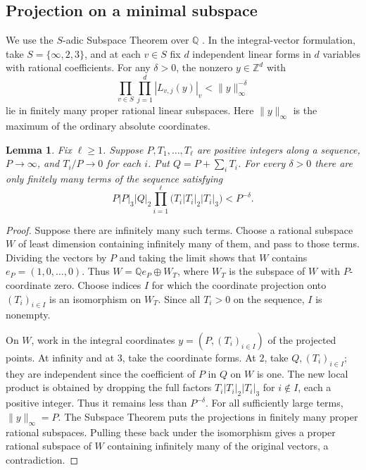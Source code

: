 \documentclass[11pt]{article}
\newtheorem{lemma}[theorem]{Lemma}
\theoremstyle{definition}
\newcommand{\Z}{\mathbb Z}
\newcommand{\Q}{\mathbb Q}
\begin{document}
\subsection{Projection on a minimal subspace}

We use the \(S\)-adic Subspace Theorem over \(\Q\)
\cite{Schlickewei}\cite[Theorem~2.3]{Bilu}.
In the integral-vector formulation, take
\(S=\{\infty,2,3\}\), and at each \(v\in S\) fix \(d\) independent
linear forms in \(d\) variables with rational coefficients.
For any \(\delta>0\), the nonzero \(y\in\Z^d\) with
\[
 \prod_{v\in S}\prod_{j=1}^{d}|L_{v,j}(y)|_v
       <\|y\|_\infty^{-\delta}
\]
lie in finitely many proper rational linear subspaces. Here
\(\|y\|_\infty\) is the maximum of the ordinary absolute coordinates.

\begin{lemma}\label{lem:projection}
Fix \(\ell\ge1\). Suppose \(P,T_1,\ldots,T_\ell\) are positive
integers along a sequence, \(P\to\infty\), and \(T_i/P\to0\) for
each \(i\). Put \(Q=P+\sum_iT_i\). For every \(\delta>0\) there
are only finitely many terms of the sequence satisfying
\[
 P|P|_3|Q|_2\prod_{i=1}^{\ell}\bigl(T_i|T_i|_2|T_i|_3\bigr)
     < P^{-\delta}.
\]
\end{lemma}

\begin{proof}
Suppose there are infinitely many such terms. Choose a rational subspace
\(W\) of least dimension containing infinitely many of them, and pass
to those terms. Dividing the vectors by \(P\) and taking the limit
shows that \(W\) contains \(e_P=(1,0,\ldots,0)\). Thus
\(W=\Q e_P\oplus W_T\), where \(W_T\) is the subspace of \(W\)
with \(P\)-coordinate zero. Choose indices \(I\) for which the
coordinate projection onto \((T_i)_{i\in I}\) is an isomorphism on
\(W_T\). Since all \(T_i>0\) on the sequence, \(I\) is nonempty.

On \(W\), work in the integral coordinates \(y=(P,(T_i)_{i\in I})\)
of the projected points. At infinity and at \(3\), take the coordinate
forms. At \(2\), take \(Q,(T_i)_{i\in I}\); they are independent since
the coefficient of \(P\) in \(Q\) on \(W\) is one. The new local
product is obtained by dropping the full factors
\(T_i|T_i|_2|T_i|_3\) for \(i\notin I\), each a positive integer.
Thus it remains less than \(P^{-\delta}\). For all sufficiently large
terms, \(\|y\|_\infty=P\). The Subspace Theorem puts the projections in
finitely many proper rational subspaces. Pulling these back under
the isomorphism gives a proper rational subspace of \(W\) containing
infinitely many of the original vectors, a contradiction.
\end{proof}
\end{document}
